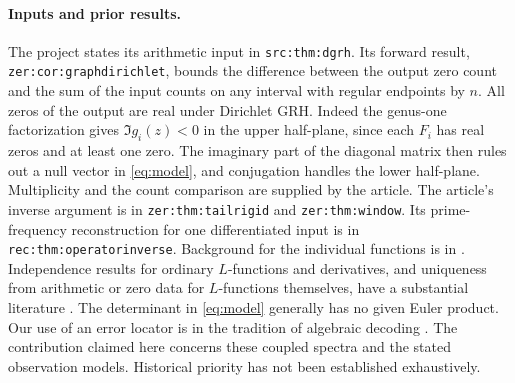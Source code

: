 \documentclass[11pt]{article}
\theoremstyle{remark}\newtheorem{remark}[theorem]{Remark}
\begin{document}
\paragraph{Inputs and prior results.}
The project states its arithmetic input in \texttt{src:thm:dgrh}. Its forward result, \texttt{zer:cor:graphdirichlet}, bounds the difference between the output zero count and the sum of the input counts on any interval with regular endpoints by $n$. All zeros of the output are real under Dirichlet GRH. Indeed the genus-one factorization gives $\Im g_i(z)<0$ in the upper half-plane, since each $F_i$ has real zeros and at least one zero. The imaginary part of the diagonal matrix then rules out a null vector in \eqref{eq:model}, and conjugation handles the lower half-plane. Multiplicity and the count comparison are supplied by the article. The article's inverse argument is in \texttt{zer:thm:tailrigid} and \texttt{zer:thm:window}. Its prime-frequency reconstruction for one differentiated input is in \texttt{rec:thm:operatorinverse}. Background for the individual functions is in \cite{dlmf}.
Independence results for ordinary $L$-functions and derivatives, and uniqueness from arithmetic or zero data for $L$-functions themselves, have a substantial literature \cite{kmp,booker,nagoshi}. The determinant in \eqref{eq:model} generally has no given Euler product. Our use of an error locator is in the tradition of algebraic decoding \cite{pellikaan}. The contribution claimed here concerns these coupled spectra and the stated observation models. Historical priority has not been established exhaustively.
\end{document}
